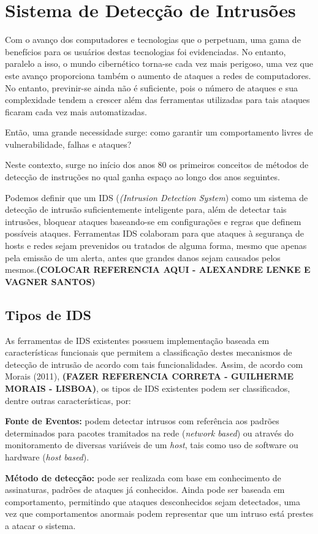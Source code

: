 \chapter{Sistema de Detecção de Intrusões}
\label{chap:IDS}

	Com o avanço dos computadores e tecnologias que o perpetuam, uma gama de benefícios para os usuários destas tecnologias foi evidenciadas. No entanto, paralelo a isso, o mundo cibernético torna-se cada vez mais perigoso, uma vez que este avanço proporciona também o aumento de ataques a redes de computadores. No entanto, previnir-se ainda não é suficiente, pois o número de ataques e sua complexidade tendem a crescer além das ferramentas utilizadas para tais ataques ficaram cada vez mais automatizadas.

	Então, uma grande necessidade surge: como garantir um comportamento livres de vulnerabilidade, falhas e ataques?

	Neste contexto, surge no início dos anos 80 os primeiros conceitos de métodos de detecção de instruções no qual ganha espaço ao longo dos anos seguintes.

	Podemos definir que um IDS (\textit{(Intrusion Detection System}) como um sistema de detecção de intrusão suficientemente inteligente para, além de detectar tais intrusões, bloquear ataques baseando-se em configurações e regras que definem possíveis ataques. Ferramentas IDS colaboram para que ataques à segurança de hosts e redes sejam prevenidos ou tratados de alguma forma, mesmo que apenas pela emissão de um alerta, antes que grandes danos sejam causados pelos mesmos.\textbf{(COLOCAR REFERENCIA AQUI - ALEXANDRE LENKE E VAGNER SANTOS)}

	\section{Tipos de IDS}
	\label{sec:IDS_Tipos}

	As ferramentas de IDS existentes possuem implementação baseada em características funcionais que permitem a classificação destes mecanismos de detecção de intrusão de acordo com tais funcionalidades. Assim, de acordo com Morais (2011), \textbf{(FAZER REFERENCIA CORRETA - GUILHERME MORAIS - LISBOA)}, os tipos de IDS existentes podem ser classificados, dentre outras características, por:
	\begin{list}{}{}
	\item \textbf{Fonte de Eventos:} podem detectar intrusos com referência aos padrões determinados para pacotes tramitados na rede (\textit{network based}) ou através do monitoramento de diversas variáveis de um \textit{host}, tais como uso de software ou hardware (\textit{host based}).
	
	\item \textbf{Método de detecção:} pode ser realizada com base em conhecimento de assinaturas, padrões de ataques já conhecidos. Ainda pode ser baseada em comportamento, permitindo que ataques desconhecidos sejam detectados, uma vez que comportamentos anormais podem representar que um intruso está prestes a atacar o sistema.	
	\end{list}

